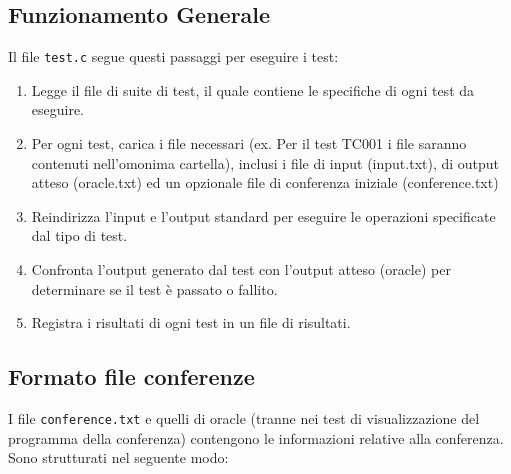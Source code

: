 \documentclass[11pt]{scrartcl} %
\begin{document}
\subsection{Funzionamento Generale}
Il file \texttt{test.c} segue questi passaggi per eseguire i test:
\begin{enumerate}
    \item Legge il file di suite di test, il quale contiene le specifiche di ogni test da eseguire.
    \item Per ogni test, carica i file necessari (ex. Per il test TC001 i file saranno contenuti nell'omonima cartella), inclusi i file di input (input.txt), di output atteso (oracle.txt) ed un opzionale file di conferenza iniziale (conference.txt)
    \item Reindirizza l'input e l'output standard per eseguire le operazioni specificate dal tipo di test.
    \item Confronta l'output generato dal test con l'output atteso (oracle) per determinare se il test è passato o fallito.
    \item Registra i risultati di ogni test in un file di risultati.
\end{enumerate}

\subsection{Formato file conferenze}
I file \texttt{conference.txt} e quelli di oracle (tranne nei test di visualizzazione del programma della conferenza) contengono le informazioni relative alla conferenza. Sono strutturati nel seguente modo:
\end{document}
